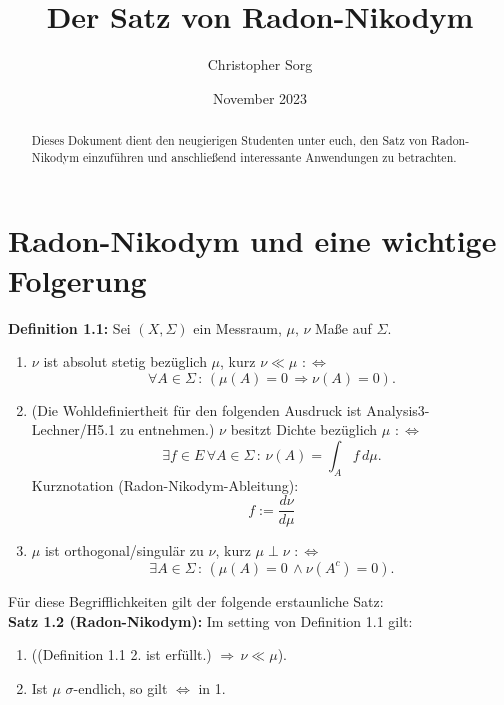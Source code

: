 \documentclass[11pt,english]{smfart}
\title{Der Satz von Radon-Nikodym}
\date {November 2023}
\author{Christopher Sorg}
\begin{document}
\def\smfbyname{}

\begin{abstract}
Dieses Dokument dient den neugierigen Studenten unter euch, den Satz von Radon-Nikodym einzuführen und anschließend interessante Anwendungen zu betrachten.
\end{abstract}
\maketitle

\tableofcontents

\section{Radon-Nikodym und eine wichtige Folgerung}
\textbf{Definition 1.1:} Sei \((X,\Sigma)\) ein Messraum, \(\mu, \, \nu\) Maße auf \(\Sigma\).
\begin{enumerate}
    \item \(\nu\) ist absolut stetig bezüglich \(\mu\), kurz \(\nu \ll \mu\) \(:\Leftrightarrow\)
    \begin{equation}
        \forall A \in \Sigma \, : \, (\mu(A) = 0 \, \Rightarrow \nu(A) = 0).
    \end{equation}
    \item (Die Wohldefiniertheit für den folgenden Ausdruck ist Analysis3-Lechner/H5.1 zu entnehmen.) \(\nu\) besitzt Dichte bezüglich \(\mu\) \(:\Leftrightarrow\)
    \begin{equation}
        \exists f \in E \, \forall A \in \Sigma \, : \, \nu(A) = \int_{A} f \, d\mu.
    \end{equation}
    Kurznotation (Radon-Nikodym-Ableitung):
    \begin{equation}
        f := \frac{d\nu}{d\mu}
    \end{equation}
    \item \(\mu\) ist orthogonal/singulär zu \(\nu\), kurz \(\mu \perp \nu\) \(:\Leftrightarrow\)
    \begin{equation}
        \exists A \in \Sigma \, : \, (\mu(A) = 0 \, \land \nu(A^c) = 0).
    \end{equation}
\end{enumerate}
\vspace{0.5cm}
Für diese Begrifflichkeiten gilt der folgende erstaunliche Satz:\\[0.5cm]
\textbf{Satz 1.2 (Radon-Nikodym):} Im setting von Definition 1.1 gilt:
\begin{enumerate}
    \item ((Definition 1.1 2. ist erfüllt.) \(\Rightarrow \, \nu \ll \mu\)).
    \item Ist \(\mu\) \(\sigma\)-endlich, so gilt \(\Leftrightarrow\) in 1.
\end{enumerate}
\end{document}
